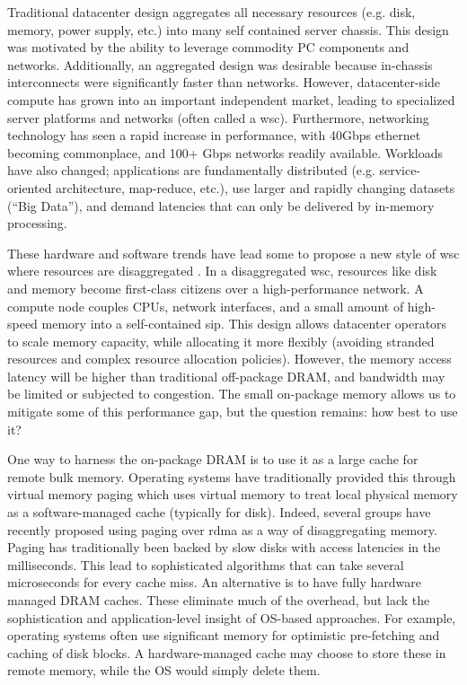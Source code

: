 Traditional datacenter design aggregates all necessary resources (e.g. disk,
memory, power supply, etc.) into many self contained server chassis. This design
was motivated by the ability to leverage commodity PC components and
networks\cite{NOW}.  Additionally, an aggregated design was
desirable because in-chassis interconnects were significantly faster than
networks. However, datacenter-side compute has grown into an important
independent market, leading to specialized server platforms and networks (often
called a \gls{wsc}).  Furthermore, networking technology
has seen a rapid increase in performance, with 40Gbps ethernet becoming
commonplace, and 100+ Gbps networks readily available. Workloads have also
changed; applications are fundamentally distributed (e.g. service-oriented
architecture, map-reduce,
etc.), use larger and rapidly changing datasets (``Big Data''), and demand
latencies that can only be delivered by in-memory processing.

These hardware and software trends have lead some to propose a new style of
\gls{wsc} where resources are
disaggregated \cite{firebox}\cite{themachine}\cite{huaweidc30}\cite{intelrsa}\cite{fbdisag}.
In a disaggregated \gls{wsc}, resources like disk and memory become first-class
citizens over a high-performance network. A compute node couples CPUs, network
interfaces, and a small amount of high-speed memory into a self-contained
\gls{sip}. This design allows datacenter operators to scale
memory capacity, while allocating it more flexibly (avoiding stranded resources
and complex resource allocation policies). However, the memory access latency
will be higher than traditional off-package DRAM, and bandwidth may be limited
or subjected to congestion. The small on-package memory allows us to mitigate
some of this performance gap, but the question remains: how best to use it?

One way to harness the on-package DRAM is to use it as a large cache for 
remote bulk memory. Operating systems have traditionally provided this through
virtual memory \gls{paging} which uses virtual memory to treat local physical memory
as a software-managed cache (typically for disk). Indeed, several groups have
recently proposed using paging over \gls{rdma} as a way of disaggregating
memory\cite{infiniswap}\cite{osdidisag}. Paging has traditionally been backed
by slow disks with access latencies in the milliseconds. This lead to
sophisticated algorithms that can take several microseconds for every cache
miss. An alternative is to have fully hardware managed DRAM
caches\cite{volos_DRAM}\cite{lee_tagless}. These eliminate much of the
overhead, but lack the sophistication and application-level insight of OS-based
approaches. For example, operating systems often use significant memory for
optimistic pre-fetching and caching of disk blocks. A hardware-managed cache
may choose to store these in remote memory, while the OS would simply delete
them.

